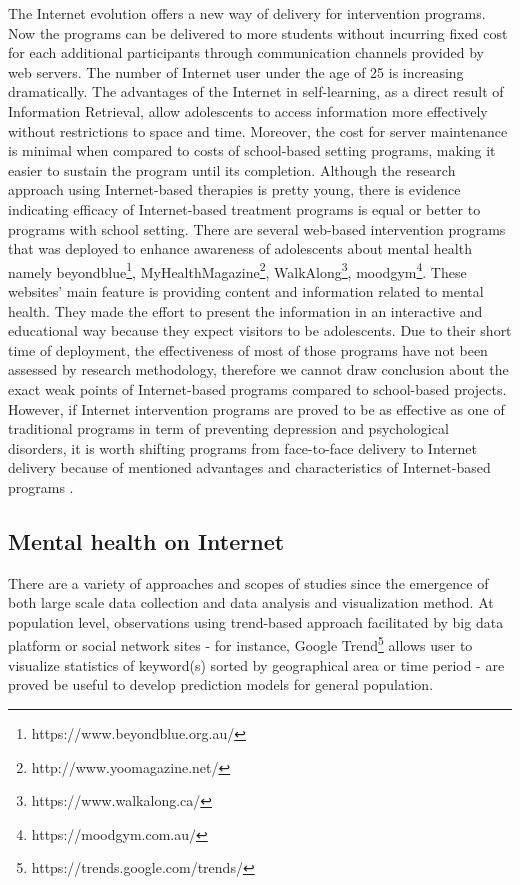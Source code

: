 The Internet evolution offers a new way of delivery for intervention programs. Now the programs can be delivered to more students without incurring fixed cost for each additional participants through communication channels provided by web servers. The number of Internet user under the age of 25 is increasing dramatically. The advantages of the Internet in self-learning, as a direct result of Information Retrieval, allow adolescents to access information more effectively without restrictions to space and time. Moreover, the cost for server maintenance is minimal when compared to costs of school-based setting programs, making it easier to sustain the program until its completion. Although the research approach using Internet-based therapies is pretty young, there is evidence indicating efficacy of Internet-based treatment programs is equal or better to programs with school setting. There are several web-based intervention programs that was deployed to enhance awareness of adolescents about mental health namely beyondblue\footnote{https://www.beyondblue.org.au/}, MyHealthMagazine\footnote{http://www.yoomagazine.net/}, WalkAlong\footnote{https://www.walkalong.ca/}, moodgym\footnote{https://moodgym.com.au/}. These websites' main feature is providing content and information related to mental health. They made the effort to present the information in an interactive and educational way because they expect visitors to be adolescents. Due to their short time of deployment, the effectiveness of most of those programs have not been assessed by research methodology, therefore we cannot draw conclusion about the exact weak points of Internet-based programs compared to school-based projects. However, if Internet intervention programs are proved to be as effective as one of traditional programs in term of preventing depression and psychological disorders, it is worth shifting programs from face-to-face delivery to Internet delivery because of mentioned advantages and characteristics of Internet-based programs \cite{Huen2016}.\\

\subsection*{Mental health on Internet}
There are a variety of approaches and scopes of studies since the emergence of both large scale data collection and data analysis and visualization method. At population level, observations using trend-based approach facilitated by big data platform or social network sites - for instance, Google Trend\footnote{https://trends.google.com/trends/ } allows user to visualize statistics of keyword(s) sorted by geographical area or time period - are proved be useful to develop prediction models for general population. \\

